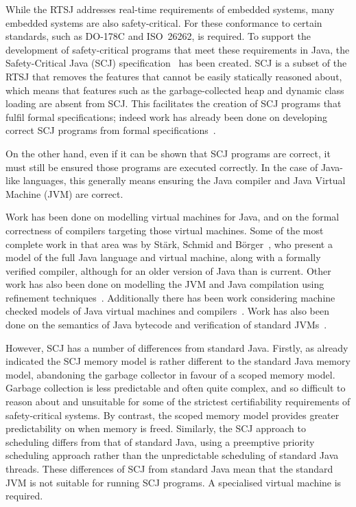 While the RTSJ addresses real-time requirements of embedded systems,
many embedded systems are also safety-critical.
For these conformance to certain standards, such as \mbox{DO-178C} and
ISO~26262, is required.
To support the development of safety-critical programs that meet these
requirements in Java, the Safety-Critical Java (SCJ)
specification~\cite{locke2013} has been created.
SCJ is a subset of the RTSJ that removes the features that cannot be
easily statically reasoned about, which means that features such as
the garbage-collected heap and dynamic class loading are absent from
SCJ.
This facilitates the creation of SCJ programs that fulfil formal
specifications; indeed work has already been done on developing
correct SCJ programs from formal specifications~\cite{cavalcanti2011,
  cavalcanti2013}.

On the other hand, even if it can be shown that SCJ programs are
correct, it must still be ensured those programs are executed
correctly.
In the case of Java-like languages, this generally means ensuring the
Java compiler and Java Virtual Machine (JVM) are correct.

Work has been done on modelling virtual machines for Java, and on the
formal correctness of compilers targeting those virtual machines.
Some of the most complete work in that area was by St\"{a}rk, Schmid
and B\"{o}rger~\cite{stark2001}, who present a model of the full Java
language and virtual machine, along with a formally verified compiler,
although for an older version of Java than is current.
Other work has also been done on modelling the JVM and Java
compilation using refinement techniques~\cite{duran2010}.
Additionally there has been work considering machine checked models of
Java virtual machines and compilers~\cite{lochbihler2012, nipkow2000,
  strecker2002}.
Work has also been done on the semantics of Java bytecode and
verification of standard JVMs~\cite{bertelsen2000, jones1998}.

However, SCJ has a number of differences from standard Java.
Firstly, as already indicated the SCJ memory model is rather different
to the standard Java memory model, abandoning the garbage collector in
favour of a scoped memory model.
Garbage collection is less predictable and often quite complex, and so
difficult to reason about and unsuitable for some of the strictest
certifiability requirements of safety-critical systems.
By contrast, the scoped memory model provides greater predictability
on when memory is freed.
Similarly, the SCJ approach to scheduling differs from that of
standard Java, using a preemptive priority scheduling approach rather
than the unpredictable scheduling of standard Java threads.
These differences of SCJ from standard Java mean that the standard JVM
is not suitable for running SCJ programs.
A specialised virtual machine is required.

